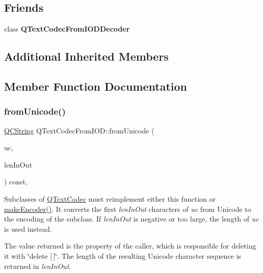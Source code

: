\subsection*{Friends}
\begin{DoxyCompactItemize}
\item 
\mbox{\label{class_q_text_codec_from_i_o_d_a44b8249b6b6d2771f87288d20aedb28b}} 
class {\bfseries Q\+Text\+Codec\+From\+I\+O\+D\+Decoder}
\end{DoxyCompactItemize}
\subsection*{Additional Inherited Members}


\subsection{Member Function Documentation}
\mbox{\label{class_q_text_codec_from_i_o_d_af5b4ad5ff7fbe98683b7bd7d54cd40c0}} 
\subsubsection{\texorpdfstring{fromUnicode()}{fromUnicode()}}
{\footnotesize\ttfamily \mbox{\hyperlink{class_q_c_string}{Q\+C\+String}} Q\+Text\+Codec\+From\+I\+O\+D\+::from\+Unicode (\begin{DoxyParamCaption}\item[{const \mbox{\hyperlink{class_q_string}{Q\+String}} \&}]{uc,  }\item[{int \&}]{len\+In\+Out }\end{DoxyParamCaption}) const\hspace{0.3cm}{\ttfamily [inline]}, {\ttfamily [virtual]}}

Subclasses of \mbox{\hyperlink{class_q_text_codec}{Q\+Text\+Codec}} must reimplement either this function or \mbox{\hyperlink{class_q_text_codec_aa7dccd7fc1b578de0b7599b040d98e11}{make\+Encoder()}}. It converts the first {\itshape len\+In\+Out} characters of {\itshape uc} from Unicode to the encoding of the subclass. If {\itshape len\+In\+Out} is negative or too large, the length of {\itshape uc} is used instead.

The value returned is the property of the caller, which is responsible for deleting it with \char`\"{}delete \mbox{[}$\,$\mbox{]}\char`\"{}. The length of the resulting Unicode character sequence is returned in {\itshape len\+In\+Out}.

